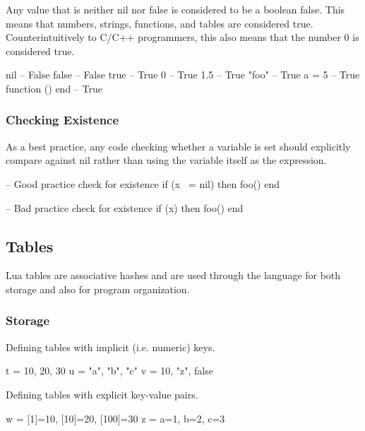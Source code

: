 \documentclass[11pt]{article}
\newcommand{\keyword}[1]{\mbox{\ttfamily#1}}
\begin{document}
Any value that is neither \keyword{nil} nor \keyword{false} is considered to be a boolean false.
This means that numbers, strings, functions, and tables are considered true.
Counterintuitively to C/C++ programmers, this also means that the number 0 is
considered true.

\begin{LuaCode}
nil             -- False
false           -- False
true            -- True
0               -- True
1.5             -- True
"foo"           -- True
{ a = 5 }       -- True
function () end -- True
\end{LuaCode}

\subsubsection{Checking Existence}

As a best practice, any code checking whether a variable is set should
explicitly compare against \keyword{nil} rather than using the variable itself as the
expression.

\begin{LuaCode}
-- Good practice check for existence
if (x ~= nil) then
	foo()
end
\end{LuaCode}

\begin{LuaCode}
-- Bad practice check for existence
if (x) then
	foo()
end
\end{LuaCode}

\subsection{Tables}

Lua tables are associative hashes and are used through the language for both
storage and also for program organization.

\subsubsection{Storage}

Defining tables with implicit (i.e. numeric) keys.

\begin{LuaCode}
t = { 10, 20, 30 }
u = { "a", "b", "c" }
v = { 10, "z", false }
\end{LuaCode}

Defining tables with explicit key-value pairs.

\begin{LuaCode}
w = { [1]=10, [10]=20, [100]=30 }
z = { a=1, b=2, c=3 }
\end{LuaCode}
\end{document}
